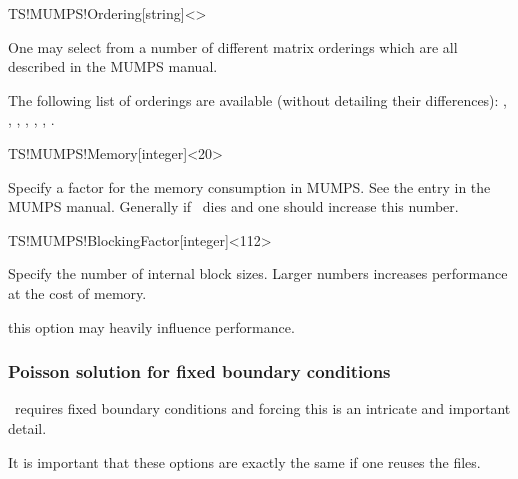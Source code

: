 \begin{fdfentry}{TS!MUMPS!Ordering}[string]<>

  One may select from a number of different matrix orderings which are
  all described in the MUMPS manual. 

  The following list of orderings are available (without detailing
  their differences): %
  , , , , ,
  , .
  
\end{fdfentry}

\begin{fdfentry}{TS!MUMPS!Memory}[integer]<20>

  Specify a factor for the memory consumption in MUMPS. See the
   entry in the MUMPS manual. Generally if \tsiesta\
  dies and  one should increase this number.
  
\end{fdfentry}

\begin{fdfentry}{TS!MUMPS!BlockingFactor}[integer]<112>

  Specify the number of internal block sizes. Larger numbers increases
  performance at the cost of memory.
  
  \note this option may heavily influence performance.

\end{fdfentry}

\subsubsection{Poisson solution for fixed boundary conditions}

\tsiesta\ requires fixed boundary conditions and forcing this is an
intricate and important detail.

It is important that these options are exactly the same if one reuses
the \sysfile{TSDE} files.

